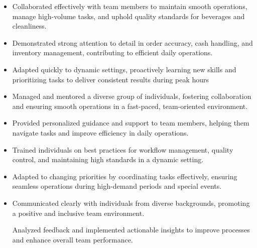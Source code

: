 \documentclass[10pt,a4paper,ragged2e,withhyper]{altacv}
\begin{document}
\begin{paracol}{2}


\begin{itemize}
    \item Collaborated effectively with team members to maintain smooth operations, manage high-volume tasks, and uphold quality standards for beverages and cleanliness.
    \item Demonstrated strong attention to detail in order accuracy, cash handling, and inventory management, contributing to efficient daily operations.
    \item Adapted quickly to dynamic settings, proactively learning new skills and prioritizing tasks to deliver consistent results during peak hours
\end{itemize}
\begin{itemize}
    \item    Managed and mentored a diverse group of individuals, fostering collaboration and ensuring smooth operations in a fast-paced, team-oriented environment.

    \item    Provided personalized guidance and support to team members, helping them navigate tasks and improve efficiency in daily operations.

    \item    Trained individuals on best practices for workflow management, quality control, and maintaining high standards in a dynamic setting.

    \item    Adapted to changing priorities by coordinating tasks effectively, ensuring seamless operations during high-demand periods and special events.

    \item    Communicated clearly with individuals from diverse backgrounds, promoting a positive and inclusive team environment.

    Analyzed feedback and implemented actionable insights to improve processes and enhance overall team performance.
\end{itemize}



\end{paracol}
\end{document}
